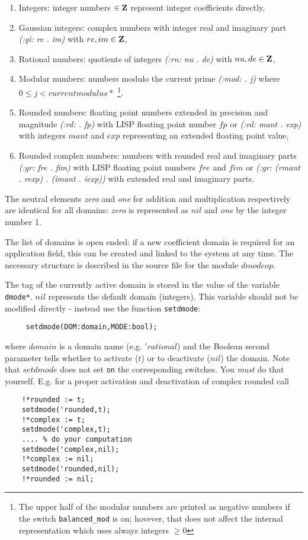 \begin{enumerate}
\item{Integers}: integer numbers $\in {\bf Z}$ represent integer 
coefficients directly,
\item{Gaussian integers}: complex numbers with integer real and
imaginary part {\em (:gi: re . im)} with $re,im \in {\bf Z}$,
\item{Rational numbers}: quotients of integers
{\em (:rn: nu . de)} with $nu,de \in {\bf Z}$,
\item{Modular numbers}: numbers modulo the current prime 
{\em (:mod: . j)} where $0 \leq j < currentmodulus*$
\footnote{The upper half of the modular numbers are printed as negative
numbers if the switch {\tt balanced\_mod} 
is on; hovever, that does not affect the internal representation
which uses always integers $\geq 0$}.
\item{Rounded numbers}: floating point numbers extended in
precision and magnitude {\em (:rd: . fp)} with LISP floating point number
$fp$ or {\em (:rd: mant . exp)} with integers $mant$ and $exp$
representing an extended floating point value,
\item{Rounded complex numbers}: numbers with rounded real
and imaginary parts {\em (:gr: fre . fim)} with LISP floating point numbers
$fre$ and $fim$ or {\em (:gr: (rmant . rexp) . (imant . iexp))} with
extended real and imaginary parts.
\end{enumerate}

The neutral elements {\em zero} and {\em one} for
addition and multiplication respectively are identical
for all domains: {\em zero} is represented as $nil$ and {\em one} by the
integer number 1.

The list of domains is open ended: if a new coefficient domain 
is required for an application field, this can be created and linked
to the system at any time. The necessary structure is described
in the source file for the module $dmodeop$.

The tag of the currently active domain is stored in the value of the
variable {\tt dmode*}. 
$nil$ represents the default domain (integers).
This variable should not be modified directly - instead use 
the function {\tt setdmode}:

\begin{verbatim}
     setdmode(DOM:domain,MODE:bool);
\end{verbatim}
where $domain$ is a domain name (e.g. $'rational$) and the Boolean
second parameter tells whether to activate ($t$) or to deactivate
($nil$) the domain. Note that $setdmode$ does not
set {\tt on} the corresponding switches. 
You {\em must} do that yourself.
E.g. for a proper activation and deactivation of complex rounded
call
\begin{verbatim}
    !*rounded := t;
    setdmode('rounded,t);
    !*complex := t;
    setdmode('complex,t);
    .... % do your computation
    setdmode('complex,nil);
    !*complex := nil;
    setdmode('rounded,nil);
    !*rounded := nil;
\end{verbatim}

